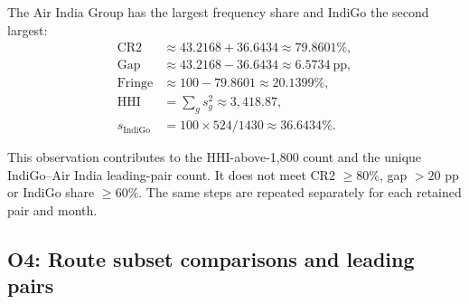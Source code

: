 The Air India Group has the largest frequency share and IndiGo the second largest:
\begin{align*}
\mathrm{CR2} &\approx 43.2168+36.6434 \approx 79.8601\%, \\
\mathrm{Gap} &\approx 43.2168-36.6434 \approx 6.5734\ \mathrm{pp}, \\
\mathrm{Fringe} &\approx 100-79.8601 \approx 20.1399\%, \\
\mathrm{HHI} &= \sum_g s_g^2 \approx 3,418.87, \\
s_{\mathrm{IndiGo}} &= 100\times524/1430 \approx 36.6434\%.
\end{align*}

This observation contributes to the HHI-above-1,800 count and the unique IndiGo--Air India leading-pair count. It does not meet CR2 $\geq80\%$, gap $>20$ pp or IndiGo share $\geq60\%$. The same steps are repeated separately for each retained pair and month.

\clearpage
\subsection{O4: Route subset comparisons and leading pairs}
\label{app:o4-route-checks}

